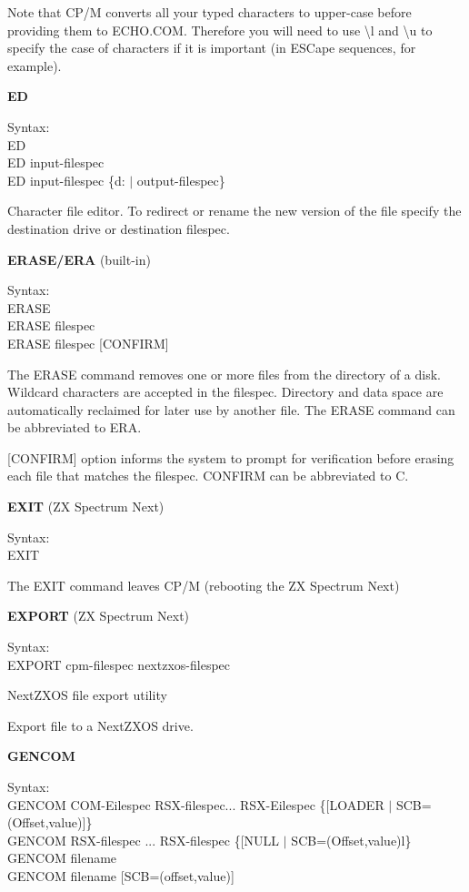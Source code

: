 Note that CP/M converts all your typed characters to upper-case before
providing them to ECHO.COM. Therefore you will need to use
\textbackslash l and \textbackslash u to specify the case of
characters if it is important (in ESCape sequences, for example).

\textbf{ED}

\hangindent=0.7cm Syntax:\\
ED\\
ED input-filespec\\
ED input-filespec \{d: \(|\) output-filespec\}

Character file editor. To redirect or rename the new version of the
file specify the destination drive or destination filespec.

\textbf{ERASE/ERA} (built-in)

\hangindent=0.7cm Syntax:\\
ERASE\\
ERASE filespec\\
ERASE filespec [CONFIRM]

The ERASE command removes one or more files from the directory of a
disk. Wildcard characters are accepted in the filespec. Directory and
data space are automatically reclaimed for later use by another
file. The ERASE command can be abbreviated to ERA.

[CONFIRM] option informs the system to prompt for verification before
erasing each file that matches the filespec. CONFIRM can be
abbreviated to C.

\textbf{EXIT} (ZX Spectrum Next)

\hangindent=0.7cm Syntax:\\
EXIT

The EXIT command leaves CP/M (rebooting the ZX Spectrum Next)

\textbf{EXPORT} (ZX Spectrum Next)

\hangindent=0.7cm Syntax:\\
EXPORT cpm-filespec nextzxos-filespec

NextZXOS file export utility

Export file to a NextZXOS drive.

\textbf{GENCOM}

\hangindent=0.7cm Syntax:\\
GENCOM COM-Eilespec RSX-filespec... RSX-Eilespec \{[LOADER \(|\)
  SCB=(Offset,value)]\}\\
GENCOM RSX-filespec ... RSX-filespec \{[NULL \(|\)
  SCB=(Offset,value)l\}\\
GENCOM filename\\
GENCOM filename [SCB=(offset,value)]


